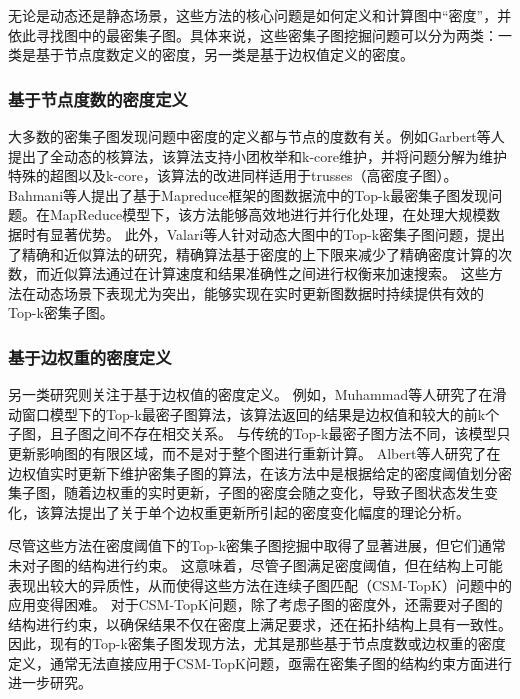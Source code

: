 无论是动态还是静态场景，这些方法的核心问题是如何定义和计算图中“密度”，并依此寻找图中的最密集子图。具体来说，这些密集子图挖掘问题可以分为两类：一类是基于节点度数定义的密度，另一类是基于边权值定义的密度。

\subsubsection{基于节点度数的密度定义}
大多数的密集子图发现问题中密度的定义都与节点的度数有关。例如Garbert等人\cite{dsm-noweight-Gabert-DBLP:conf/wsdm/GabertPC21}提出了全动态的核算法，该算法支持小团枚举和k-core维护，并将问题分解为维护特殊的超图以及k-core，该算法的改进同样适用于trusses（高密度子图）。
Bahmani等人\cite{dsm-noweight-Bahmani-DBLP:journals/pvldb/BahmaniKV12}提出了基于Mapreduce框架的图数据流中的Top-k最密集子图发现问题。在MapReduce模型\cite{csm-mapreduce-DBLP:journals/cacm/DeanG08}下，该方法能够高效地进行并行化处理，在处理大规模数据时有显著优势。
此外，Valari等人\cite{dsm-noweight-Valari-DBLP:conf/ssdbm/ValariKP12}针对动态大图中的Top-k密集子图问题，提出了精确和近似算法的研究，精确算法基于密度的上下限来减少了精确密度计算的次数，而近似算法通过在计算速度和结果准确性之间进行权衡来加速搜索。
这些方法在动态场景下表现尤为突出，能够实现在实时更新图数据时持续提供有效的Top-k密集子图。

\subsubsection{基于边权重的密度定义}
另一类研究则关注于基于边权值的密度定义。
例如，Muhammad\cite{dsm-weight-Muhammad-DBLP:conf/cikm/NasirGMG17}等人研究了在滑动窗口模型下的Top-k最密子图算法，该算法返回的结果是边权值和较大的前k个子图，且子图之间不存在相交关系。
与传统的Top-k最密子图方法不同，该模型只更新影响图的有限区域，而不是对于整个图进行重新计算。
Albert等人\cite{dsm-weight-Angel-DBLP:journals/vldb/AngelKSSST14}研究了在边权值实时更新下维护密集子图的算法，在该方法中是根据给定的密度阈值划分密集子图，随着边权重的实时更新，子图的密度会随之变化，导致子图状态发生变化，该算法提出了关于单个边权重更新所引起的密度变化幅度的理论分析。

尽管这些方法在密度阈值下的Top-k密集子图挖掘中取得了显著进展，但它们通常未对子图的结构进行约束。
这意味着，尽管子图满足密度阈值，但在结构上可能表现出较大的异质性，从而使得这些方法在连续子图匹配（CSM-TopK）问题中的应用变得困难。
对于CSM-TopK问题，除了考虑子图的密度外，还需要对子图的结构进行约束，以确保结果不仅在密度上满足要求，还在拓扑结构上具有一致性。
因此，现有的Top-k密集子图发现方法，尤其是那些基于节点度数或边权重的密度定义，通常无法直接应用于CSM-TopK问题，亟需在密集子图的结构约束方面进行进一步研究。

